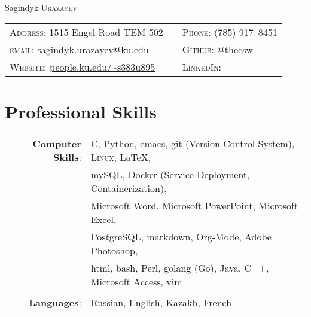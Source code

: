 \documentclass[a4paper,10pt]{article}
\begin{document}
\pagestyle{empty} %

\par{\centering
		{\Huge Sagindyk \textsc{Urazayev}
	}\bigskip\par}

      \begin{center}
        \begin{tabular}{lcl}
          \textsc{Address:}   1515 Engel Road TEM 502 &&
                                                         \textsc{Phone:}      (785) 917--8451\\
          \textsc{email:}      \href{mailto:sagindyk.urazayev@ku.edu}{sagindyk.urazayev@ku.edu}&&
                                                                                                  \textsc{Github:} \href{https://github.com/thecsw}{@thecsw}\\
          \textsc{Website:} \href{http://people.ku.edu/~s383u895}{people.ku.edu/\textasciitilde{}s383u895} && \textsc{LinkedIn:} \href{}{}\\
        \end{tabular}
      \end{center}
      
\section{Professional Skills}
\begin{tabular}{rl}

  \textbf{Computer Skills}:& C, Python, emacs, git (Version Control System), \textsc{Linux}, \LaTeX, \\& mySQL,
  Docker (Service Deployment, Containerization),\\& Microsoft Word, Microsoft PowerPoint, Microsoft Excel,\\&
  PostgreSQL, markdown, Org-Mode, Adobe Photoshop, \\& html, bash, Perl, golang (Go), Java, C++, Microsoft Access, vim\\\\

  \textbf{Languages}: &Russian, English, Kazakh, French\\
  
\end{tabular}
\end{document}
